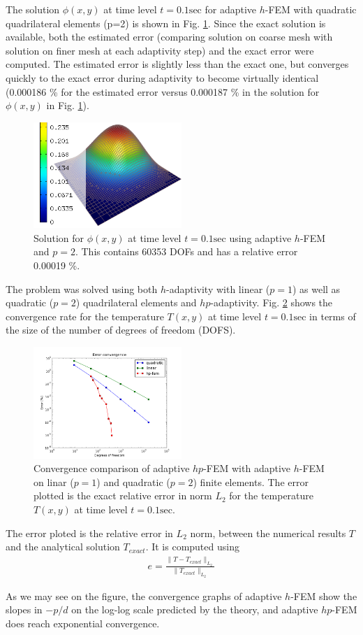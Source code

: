 The solution $\phi(x,y)$ at time level $t=0.1 \mbox{sec}$ for adaptive $h$-FEM with quadratic quadrilateral elements (p=2) is shown in Fig. \ref{sol_temp}.  Since the exact solution is available, both the estimated error (comparing solution on coarse mesh with solution on finer mesh at each adaptivity step) and the exact error were computed.  The estimated error is slightly less than the exact one, but converges quickly to the exact error during adaptivity to become virtually identical (0.000186 \% for the estimated error versus 0.000187 \% in the solution for $\phi(x,y)$ in Fig. \ref{sol_temp}).
\begin{figure}
  \includegraphics[width=0.5\textwidth]{figures/solution_T}
  \caption{Solution for $\phi(x,y)$ at time level $t=0.1 \mbox{sec}$ using adaptive $h$-FEM and $p=2$.  This contains 60353 DOFs and has a relative error 0.00019 \%.}
  \label{sol_temp}
\end{figure}

The problem was solved using both $h$-adaptivity with linear ($p=1$) as well as quadratic ($p=2$) quadrilateral elements and $hp$-adaptivity.  Fig. \ref{err_conv} shows the convergence rate for the temperature $T(x,y)$ at time level $t=0.1 \mbox{sec}$ in terms of the size of the number of degrees of freedom (DOFS).
\begin{figure}
  \includegraphics[width=0.5\textwidth]{figures/exact_err_conv}
  \caption{Convergence comparison of adaptive $hp$-FEM with adaptive $h$-FEM on linar ($p=1$) and quadratic ($p=2$) finite elements.  The error plotted is the exact relative error in norm $L_2$ for the temperature $T(x,y)$ at time level $t=0.1 \mbox{sec}$.}
  \label{err_conv}
\end{figure}

The error ploted is the relative error in $L_2$ norm, between the numerical results $T$ and the analytical solution $T_{exact}$.  It is computed using
\begin{align}
  e = \frac{ \|T-T_{exact}\|_{L_2} }{ \|T_{exact}\|_{L_2} }
\end{align}

As we may see on the figure, the convergence graphs of adaptive $h$-FEM show the slopes in $-p/d$ on the log-log scale predicted by the theory, and adaptive $hp$-FEM does reach exponential convergence.
